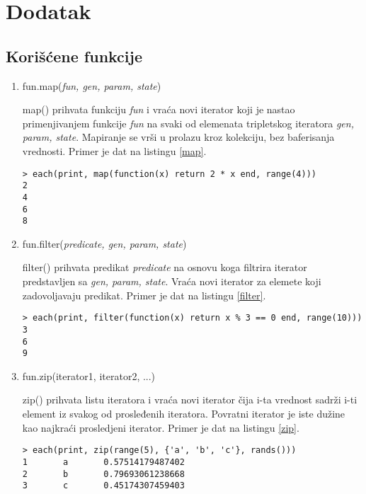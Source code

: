 \documentclass[a4paper]{article}
\begin{document}
\appendix
 


\appendix
\section{Dodatak}
\subsection{Korišćene funkcije}
\label{dodaci}


\begin{enumerate}
  \item  fun.map(\textit{fun, gen, param, state})
  
  map() prihvata funkciju \textit{fun} i vraća novi iterator koji je nastao primenjivanjem funkcije \textit{fun} na svaki od elemenata tripletskog iteratora \textit{gen, param, state}. Mapiranje se vrši u prolazu kroz kolekciju, bez baferisanja vrednosti. Primer je dat na listingu \ref{map}. \cite{luafun}
   \begin{lstlisting}[caption={Primer funkcije map()},frame=single, label=map]
> each(print, map(function(x) return 2 * x end, range(4)))
2
4
6
8
\end{lstlisting}
  \item fun.filter(\textit{predicate, gen, param, state})
  
  filter() prihvata predikat \textit{predicate} na osnovu koga filtrira iterator predstavljen sa \textit{gen, param, state}. Vraća novi iterator za elemete koji zadovoljavaju predikat. Primer je dat na listingu \ref{filter}. \cite{luafun}
   \begin{lstlisting}[caption={Primer funkcije filter()},frame=single, label=filter]
> each(print, filter(function(x) return x % 3 == 0 end, range(10)))
3
6
9
\end{lstlisting}
\item fun.zip(iterator1, iterator2, ...)

   zip() prihvata listu iteratora i vraća novi iterator čija i-ta vrednost sadrži i-ti element iz svakog od prosleđenih iteratora. Povratni iterator je iste dužine kao najkraći prosledjeni iterator. Primer je dat na listingu \ref{zip}. \cite{luafun}
   \begin{lstlisting}[caption={Primer funkcije zip()},frame=single, label=zip]
> each(print, zip(range(5), {'a', 'b', 'c'}, rands()))
1       a       0.57514179487402
2       b       0.79693061238668
3       c       0.45174307459403
\end{lstlisting}
\end{enumerate}
\end{document}
